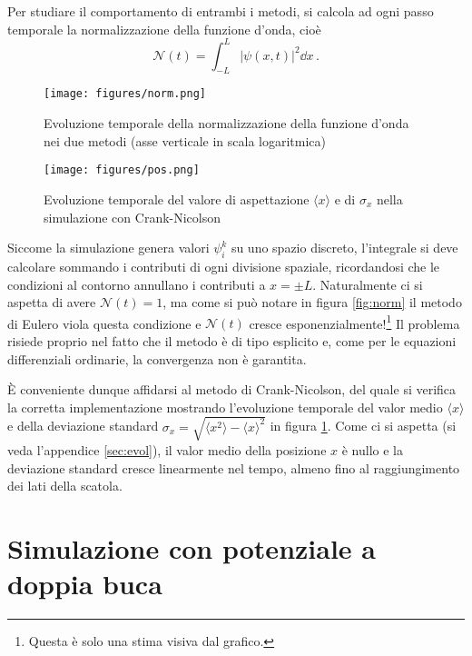 \documentclass[a4paper, titlepage]{article}
\numberwithin{equation}{section}
\begin{document}
Per studiare il comportamento di entrambi i metodi, si calcola ad ogni passo temporale la normalizzazione della funzione d'onda, cioè
\[
    \mathcal{N}(t) = \int_{-L}^L |\psi(x,t)|^2 \dd{x}\, .
\]
\begin{figure}[h!]
    \centering
    \begin{minipage}{0.47 \textwidth}
        \centering
        \texttt{[image: figures/norm.png]}
        \caption{Evoluzione temporale della normalizzazione della funzione d'onda nei due metodi (asse verticale in scala logaritmica)}
        \label{fig:norm}
    \end{minipage}
    \hspace{0.02\textwidth}
    \begin{minipage}{0.47 \textwidth}
        \centering
        \texttt{[image: figures/pos.png]}
        \caption{Evoluzione temporale del valore di aspettazione $\langle x \rangle$ e di $\sigma_x$ nella simulazione con Crank-Nicolson}
        \label{fig:pos}
    \end{minipage}
\end{figure}
Siccome la simulazione genera valori $\psi_i^k$ su uno spazio discreto, l'integrale si deve calcolare sommando i contributi di ogni divisione spaziale, ricordandosi che le condizioni al contorno annullano i contributi a $x = \pm L$.
Naturalmente ci si aspetta di avere $\mathcal{N}(t) = 1$, ma come si può notare in figura \ref{fig:norm} il metodo di Eulero viola questa condizione e $\mathcal{N}(t)$ cresce esponenzialmente!\footnote{Questa è solo una stima visiva dal grafico.}
Il problema risiede proprio nel fatto che il metodo è di tipo esplicito e, come per le equazioni differenziali ordinarie, la convergenza non è garantita. 

È conveniente dunque affidarsi al metodo di Crank-Nicolson, del quale si verifica la corretta implementazione mostrando l'evoluzione temporale del valor medio $\langle x \rangle$ e della deviazione standard $\sigma_x = \sqrt{\langle x^2 \rangle - \langle x \rangle^2}$ in figura \ref{fig:pos}. Come ci si aspetta (si veda l'appendice \ref{sec:evol}), il valor medio della posizione $x$ è nullo e la deviazione standard cresce linearmente nel tempo, almeno fino al raggiungimento dei lati della scatola.


\section{Simulazione con potenziale a doppia buca}
\end{document}
